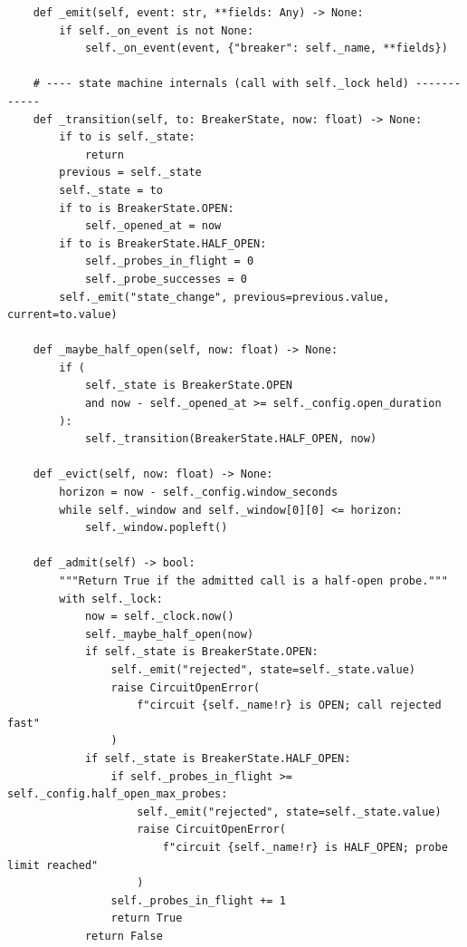 \begin{verbatim}
    def _emit(self, event: str, **fields: Any) -> None:
        if self._on_event is not None:
            self._on_event(event, {"breaker": self._name, **fields})

    # ---- state machine internals (call with self._lock held) ------------
    def _transition(self, to: BreakerState, now: float) -> None:
        if to is self._state:
            return
        previous = self._state
        self._state = to
        if to is BreakerState.OPEN:
            self._opened_at = now
        if to is BreakerState.HALF_OPEN:
            self._probes_in_flight = 0
            self._probe_successes = 0
        self._emit("state_change", previous=previous.value, current=to.value)

    def _maybe_half_open(self, now: float) -> None:
        if (
            self._state is BreakerState.OPEN
            and now - self._opened_at >= self._config.open_duration
        ):
            self._transition(BreakerState.HALF_OPEN, now)

    def _evict(self, now: float) -> None:
        horizon = now - self._config.window_seconds
        while self._window and self._window[0][0] <= horizon:
            self._window.popleft()

    def _admit(self) -> bool:
        """Return True if the admitted call is a half-open probe."""
        with self._lock:
            now = self._clock.now()
            self._maybe_half_open(now)
            if self._state is BreakerState.OPEN:
                self._emit("rejected", state=self._state.value)
                raise CircuitOpenError(
                    f"circuit {self._name!r} is OPEN; call rejected fast"
                )
            if self._state is BreakerState.HALF_OPEN:
                if self._probes_in_flight >= self._config.half_open_max_probes:
                    self._emit("rejected", state=self._state.value)
                    raise CircuitOpenError(
                        f"circuit {self._name!r} is HALF_OPEN; probe limit reached"
                    )
                self._probes_in_flight += 1
                return True
            return False


\end{verbatim}
